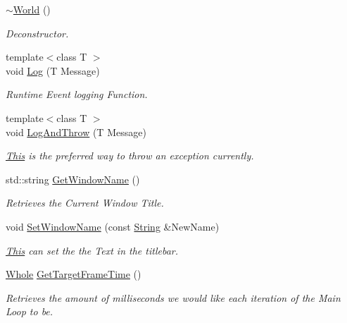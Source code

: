 \begin{DoxyCompactItemize}
\hyperlink{classphys_1_1World_a8b2c74c7e5d5ce3c46a814e183a7aff1}{$\sim$World} ()
\begin{DoxyCompactList}\small\item\em Deconstructor. \item\end{DoxyCompactList}\item 
{\footnotesize template$<$class T $>$ }\\void \hyperlink{classphys_1_1World_a05267a20e8d5518771d0848190b33d60}{Log} (T Message)
\begin{DoxyCompactList}\small\item\em Runtime Event logging Function. \item\end{DoxyCompactList}\item 
{\footnotesize template$<$class T $>$ }\\void \hyperlink{classphys_1_1World_a88e6bdee6b972111b6804ca746738c50}{LogAndThrow} (T Message)
\begin{DoxyCompactList}\small\item\em \hyperlink{structThis}{This} is the preferred way to throw an exception currently. \item\end{DoxyCompactList}\item 
std::string \hyperlink{classphys_1_1World_a1f0139bbc9561bcf18844be25e4adc73}{GetWindowName} ()
\begin{DoxyCompactList}\small\item\em Retrieves the Current Window Title. \item\end{DoxyCompactList}\item 
void \hyperlink{classphys_1_1World_acd0dff342c08fe3008226488b7c53d97}{SetWindowName} (const \hyperlink{namespacephys_aa03900411993de7fbfec4789bc1d392e}{String} \&NewName)
\begin{DoxyCompactList}\small\item\em \hyperlink{structThis}{This} can set the the Text in the titlebar. \item\end{DoxyCompactList}\item 
\hyperlink{namespacephys_a460f6bc24c8dd347b05e0366ae34f34a}{Whole} \hyperlink{classphys_1_1World_aa063ace52be484c7b03ec5859453f48b}{GetTargetFrameTime} ()
\begin{DoxyCompactList}\small\item\em Retrieves the amount of milliseconds we would like each iteration of the Main Loop to be. \item\end{DoxyCompactList}\item 

\end{DoxyCompactItemize}

